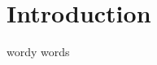 \documentclass[main.tex]{subfiles}
\begin{document}
\chapter{Introduction}

wordy words
\end{document}
